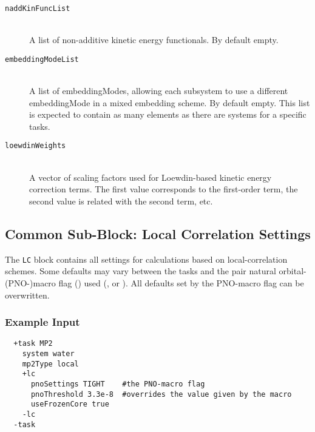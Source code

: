 \begin{description}
  \item [\texttt{naddKinFuncList}]\hfill \\
    A list of non-additive kinetic energy functionals. By default empty.
  \item [\texttt{embeddingModeList}]\hfill \\
    A list of embeddingModes, allowing each subsystem to use a different embeddingMode in a mixed embedding scheme. By default empty. This list is expected to contain as many elements as there are systems for a specific tasks.
  \item [\texttt{loewdinWeights}]\hfill \\
    A vector of scaling factors used for Loewdin-based kinetic energy correction terms. The first value corresponds to the first-order term, the second value is related with the second term, etc.
\end{description}

\subsection{Common Sub-Block: Local Correlation Settings}
\label{sec:scb:lc}
The \texttt{LC} block contains all settings for calculations based on local-correlation schemes.
Some defaults may vary between the tasks and the pair natural orbital-(PNO-)macro flag
() used (,  or ).
All defaults set by the PNO-macro flag  can be overwritten.

\subsubsection{Example Input}
\begin{lstlisting}
  +task MP2
    system water  
    mp2Type local
    +lc 
      pnoSettings TIGHT    #the PNO-macro flag
      pnoThreshold 3.3e-8  #overrides the value given by the macro
      useFrozenCore true
    -lc 
  -task
 \end{lstlisting}
